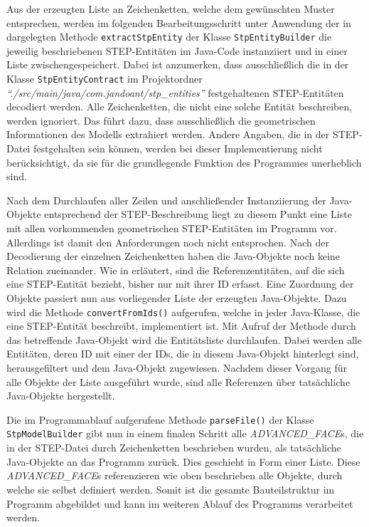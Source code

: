 Aus der erzeugten Liste an Zeichenketten, welche dem gewünschten Muster entsprechen, werden im folgenden Bearbeitungsschritt unter Anwendung der in  dargelegten Methode \verb|extractStpEntity| der Klasse  \verb|StpEntityBuilder| die jeweilig beschriebenen STEP-Entitäten im Java-Code instanziiert und in einer Liste zwischengespeichert. Dabei ist anzumerken, dass ausschließlich die in der Klasse \verb|StpEntityContract| im Projektordner \textit{"`./src/\-main/\-java/\-com.jandoant/\-stp\_entities"'} festgehaltenen STEP-Entitäten decodiert werden. Alle Zeichenketten, die nicht eine solche Entität beschreiben, werden ignoriert. Das führt dazu, dass ausschließlich die geometrischen Informationen des Modells extrahiert werden. Andere Angaben, die in der STEP-Datei festgehalten sein können, werden bei dieser Implementierung nicht berücksichtigt, da sie für die grundlegende Funktion des Programmes unerheblich sind.

Nach dem Durchlaufen aller Zeilen und anschließender Instanziierung der Java-Objekte entsprechend der STEP-Beschreibung liegt zu diesem Punkt eine Liste mit allen vorkommenden geometrischen STEP-Entitäten im Programm vor. Allerdings ist damit den Anforderungen noch nicht entsprochen. Nach der Decodierung der einzelnen Zeichenketten haben die Java-Objekte noch keine Relation zueinander. Wie in  erläutert, sind die Referenzentitäten, auf die sich eine STEP-Entität bezieht, bisher nur mit ihrer ID erfasst. Eine Zuordnung der Objekte passiert nun aus vorliegender Liste der erzeugten Java-Objekte. 
Dazu wird die Methode \verb|convertFromIds()| aufgerufen, welche in jeder Java-Klasse, die eine STEP-Entität beschreibt, implementiert ist.
Mit Aufruf der Methode durch das betreffende Java-Objekt wird die Entitätsliste durchlaufen. Dabei werden alle Entitäten, deren ID mit einer der IDs, die in diesem Java-Objekt hinterlegt sind, herausgefiltert und dem Java-Objekt zugewiesen. Nachdem dieser Vorgang für alle Objekte der Liste ausgeführt wurde, sind alle Referenzen über tatsächliche Java-Objekte hergestellt. 

Die im Programmablauf aufgerufene Methode \verb|parseFile()| der Klasse \verb|StpModelBuilder| gibt nun in einem finalen Schritt alle \textit{ADVANCED\_FACE}s, die in der STEP-Datei durch Zeichenketten beschrieben wurden, als tatsächliche Java-Objekte an das Programm zurück. Dies geschieht in Form einer Liste. Diese \textit{ADVANCED\_FACE}s  referenzieren wie oben beschrieben alle Objekte, durch welche sie selbst definiert werden. Somit ist die gesamte Bauteilstruktur im Programm abgebildet und kann im weiteren Ablauf des Programms verarbeitet werden.

